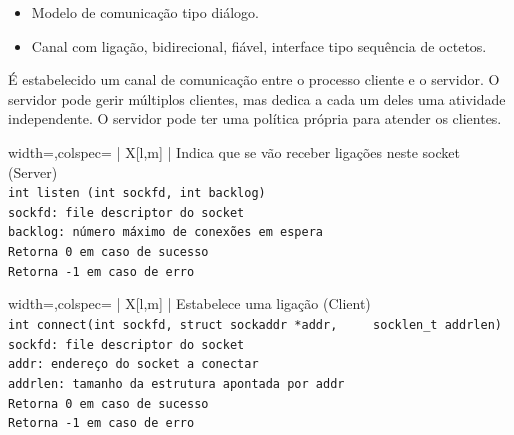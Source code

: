\documentclass[11pt]{article}
\begin{document}
\begin{itemize}
    \item Modelo de comunicação tipo diálogo.
    \item Canal com ligação, bidirecional, fiável, interface tipo sequência de octetos.
\end{itemize}

É estabelecido um canal de comunicação entre o processo cliente e o servidor. O servidor pode gerir múltiplos clientes, mas dedica a cada um deles uma atividade independente. O servidor pode ter uma política própria para atender os clientes.

\begin{tblr}{width=\linewidth,colspec={ | X[l,m] | }}
    \hline
    \centering Indica que se vão receber ligações neste socket (Server) \\\hline
    \lstinline|int listen (int sockfd, int backlog)|                    \\\hline
    \lstinline|sockfd: file descriptor do socket|                       \\
    \lstinline|backlog: número máximo de conexões em espera|            \\\hline
    \lstinline|Retorna 0 em caso de sucesso|                            \\
    \lstinline|Retorna -1 em caso de erro|                              \\\hline
\end{tblr}

\begin{tblr}{width=\linewidth,colspec={ | X[l,m] | }}
    \hline
    \centering Estabelece uma ligação (Client)                  \\\hline
    \lstinline|int connect(int sockfd, struct sockaddr *addr,
    socklen_t addrlen)|                                         \\\hline
    \lstinline|sockfd: file descriptor do socket|               \\
    \lstinline|addr: endereço do socket a conectar|             \\
    \lstinline|addrlen: tamanho da estrutura apontada por addr| \\\hline
    \lstinline|Retorna 0 em caso de sucesso|                    \\
    \lstinline|Retorna -1 em caso de erro|                      \\\hline
\end{tblr}
\end{document}
